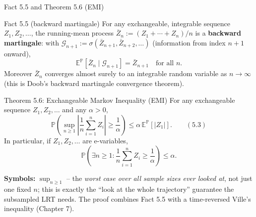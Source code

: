 \documentclass[aspectratio=169,10pt]{beamer}
\renewcommand{\P}{\mathbb{P}}
\newcommand{\E}{\mathbb{E}}
\begin{document}
\begin{frame}[allowframebreaks]{Fact 5.5 and Theorem 5.6 (EMI)}

  \begin{block}{Fact 5.5 (backward martingale)}
    For any exchangeable, integrable sequence $Z_1,Z_2,\ldots$, the
    running-mean process $\bar Z_n := (Z_1+\cdots+Z_n)/n$ is a
    \textbf{backward martingale}: with $\mathcal{G}_{n+1} :=
    \sigma(\bar Z_{n+1}, \bar Z_{n+2}, \ldots)$ (information from index
    $n+1$ onward),
    $$ \E^\P[\bar Z_n \mid \mathcal{G}_{n+1}] = \bar Z_{n+1} \quad \text{for all } n. $$
    Moreover $\bar Z_n$ converges almost surely to an integrable random
    variable as $n \to \infty$ (this is Doob's backward martingale
    convergence theorem).
  \end{block}

  \begin{alertblock}{Theorem 5.6: Exchangeable Markov Inequality (EMI)}
    For any exchangeable sequence $Z_1, Z_2, \ldots$ and any $\alpha > 0$,
    $$ \P\left(\sup_{n\ge 1} \left|\frac{1}{n}\sum_{i=1}^n Z_i\right| \ge \frac{1}{\alpha}\right) \le \alpha\, \E^\P[|Z_1|]. \qquad (5.3)$$
    In particular, if $Z_1, Z_2, \ldots$ are e-variables,
    $$ \P\left(\exists n \ge 1 : \frac{1}{n}\sum_{i=1}^n Z_i \ge \frac1\alpha \right) \le \alpha. $$
  \end{alertblock}

  \textbf{Symbols:} $\sup_{n\ge1}$ -- the \emph{worst case over all
  sample sizes ever looked at}, not just one fixed $n$; this is exactly
  the ``look at the whole trajectory'' guarantee the subsampled LRT
  needs. The proof combines Fact 5.5 with a time-reversed Ville's
  inequality (Chapter 7).

\end{frame}
\end{document}

